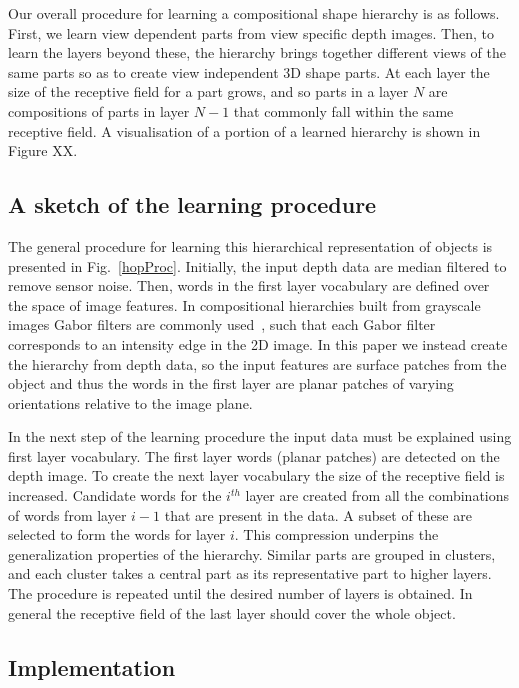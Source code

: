 \documentclass[letterpaper,10pt,conference]{ieeeconf}  %
\begin{document}
Our overall procedure for learning a compositional shape hierarchy is as follows. First, we learn view dependent parts from view specific depth images. Then, to learn the layers beyond these, the hierarchy brings together different views of the same parts so as to create view independent 3D shape parts. At each layer the size of the receptive field for a part grows, and so parts in a layer $N$ are compositions of parts in layer $N-1$ that commonly fall within the same receptive field.  A visualisation of a portion of a learned hierarchy is shown in Figure XX.  

\subsection{A sketch of the learning procedure}
The general procedure for learning this hierarchical representation of objects is presented in Fig.~\ref{hopProc}. Initially, the input depth data are median filtered to remove sensor noise. Then, words in the first layer vocabulary are defined over the space of image features. In compositional hierarchies built from grayscale images Gabor filters are commonly used~\cite{Fiedler2014}, such that each Gabor filter corresponds to an intensity edge in the 2D image. In this paper we instead create the hierarchy from depth data, so the input features are surface patches from the object and thus the words in the first layer are planar patches of varying orientations relative to the image plane. 

In the next step of the learning procedure the input data must be explained using first layer vocabulary. The first layer words (planar patches) are detected on the depth image. To create the next layer vocabulary the size of the receptive field is increased. Candidate words for the $i^{th}$ layer are created from all the combinations of words from layer $i-1$ that are present in the data. A subset of these are selected to form the words for layer $i$. This compression underpins the generalization properties of the hierarchy. Similar parts are grouped in clusters, and each cluster takes a central part as its representative part to higher layers. The procedure is repeated until the desired number of layers is obtained. In general the receptive field of the last layer should cover the whole object.

\subsection{Implementation}
\end{document}
